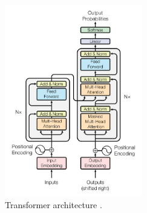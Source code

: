 \documentclass[letterpaper]{article} %
\begin{document}
\begin{figure}[htbp]
\centerline{\includegraphics[width=6cm]{transformer.png}}
\caption{Transformer architecture
	\cite{attention_need}.}
\label{fig:transformer}
\end{figure}

%
%
%
\end{document}
